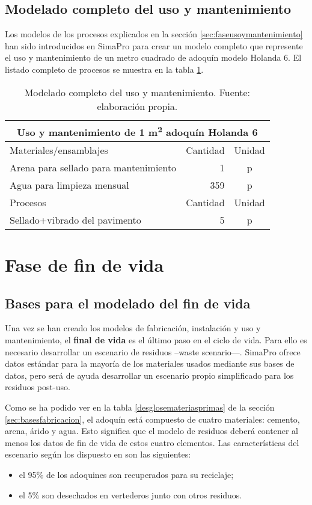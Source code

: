 \subsection{Modelado completo del uso y mantenimiento}

Los modelos de los procesos explicados en la sección \ref{sec:faseusoymantenimiento} han sido introducidos en SimaPro para crear un modelo completo que represente el uso y mantenimiento de un metro cuadrado de adoquín modelo Holanda 6. El listado completo de procesos se muestra en la tabla \ref{modeladocompletousoymantenimiento}.

\begin{table}[!htb]
\centering
\begin{tabular}{p{8cm}rc}
\toprule
\multicolumn{3}{c}{Uso y mantenimiento de 1 \si{m^2} adoquín Holanda 6}\\
\midrule
Materiales/ensamblajes & Cantidad & Unidad\\
\midrule
Arena para sellado para mantenimiento & 1 & p\\
Agua para limpieza mensual & 359 & p\\
\midrule
Procesos & Cantidad & Unidad\\
\midrule
Sellado+vibrado del pavimento & 5 & p\\
\bottomrule
\end{tabular}
\caption[Modelado completo del uso y mantenimiento.]{Modelado completo del uso y mantenimiento. Fuente: elaboración propia.}
\label{modeladocompletousoymantenimiento}
\end{table}

\section{Fase de fin de vida}\label{sec:fasefindevida}

\subsection{Bases para el modelado del fin de vida}
Una vez se han creado los modelos de fabricación, instalación y uso y mantenimiento, el \textbf{final de vida} es el último paso en el ciclo de vida. Para ello es necesario desarrollar un escenario de residuos –waste scenario—. SimaPro ofrece datos estándar para la mayoría de los materiales usados mediante sus bases de datos, pero será de ayuda desarrollar un escenario propio simplificado para los residuos post-uso.

Como se ha podido ver en la tabla \ref{desglosemateriasprimas} de la sección \ref{sec:basesfabricacion}, el adoquín está compuesto de cuatro materiales: cemento, arena, árido y agua. Esto significa que el modelo de residuos deberá contener al menos los datos de fin de vida de estos cuatro elementos. Las características del escenario según los dispuesto en \cite{euroadoquin} son las siguientes:
\begin{itemize}
  \item el 95\% de los adoquines son recuperados para su reciclaje;
  \item el 5\% son desechados en vertederos junto con otros residuos.
\end{itemize}

